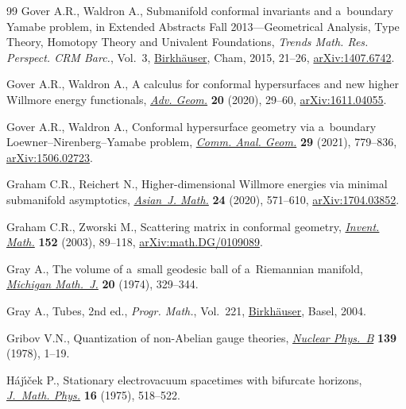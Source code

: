 \documentclass[10pt,a4paper]{article}
\numberwithin{equation}{section}
\renewcommand{\=}{\stackrel \Lambda =}
\begin{document}
\begin{thebibliography}{99}
Gover A.R., Waldron A., Submanifold conformal invariants and a~boundary
 {Y}amabe problem, in Extended Abstracts {F}all 2013---Geometrical Analysis,
 Type Theory, Homotopy Theory and Univalent Foundations, \textit{Trends Math.
 Res. Perspect. CRM Barc.}, Vol.~3, \href{https://doi.org/10.1007/978-3-319-21284-5_4}{Birkh\"auser}, Cham, 2015, 21--26,
 \href{https://arxiv.org/abs/1407.6742}{arXiv:1407.6742}.

Gover A.R., Waldron A., A calculus for conformal hypersurfaces and new higher
 {W}illmore energy functionals, \href{https://doi.org/10.1515/advgeom-2019-0016}{\textit{Adv. Geom.}} \textbf{20} (2020),
 29--60, \href{https://arxiv.org/abs/1611.04055}{arXiv:1611.04055}.

Gover A.R., Waldron A., Conformal hypersurface geometry via a~boundary
 {L}oewner--{N}irenberg--{Y}amabe problem, \href{https://doi.org/10.4310/CAG.2021.v29.n4.a2}{\textit{Comm. Anal. Geom.}}
 \textbf{29} (2021), 779--836, \href{https://arxiv.org/abs/1506.02723}{arXiv:1506.02723}.

Graham C.R., Reichert N., Higher-dimensional {W}illmore energies via minimal
 submanifold asymptotics, \href{https://doi.org/10.4310/AJM.2020.v24.n4.a3}{\textit{Asian~J. Math.}} \textbf{24} (2020),
 571--610, \href{https://arxiv.org/abs/1704.03852}{arXiv:1704.03852}.

Graham C.R., Zworski M., Scattering matrix in conformal geometry,
 \href{https://doi.org/10.1007/s00222-002-0268-1}{\textit{Invent. Math.}} \textbf{152} (2003), 89--118,
 \href{https://arxiv.org/abs/math.DG/0109089}{arXiv:math.DG/0109089}.

Gray A., The volume of a~small geodesic ball of a~{R}iemannian manifold,
 \href{https://doi.org/10.1307/mmj/1029001150}{\textit{Michigan Math.~J.}} \textbf{20} (1974), 329--344.

Gray A., Tubes, 2nd ed., \textit{Progr. Math.}, Vol.~221, \href{https://doi.org/10.1007/978-3-0348-7966-8}{Birkh\"auser}, Basel,
 2004.

Gribov V.N., Quantization of non-{A}belian gauge theories, \href{https://doi.org/10.1016/0550-3213(78)90175-X}{\textit{Nuclear
 Phys.~B}} \textbf{139} (1978), 1--19.

H\'aj{\'\i}{\v{c}}ek P., Stationary electrovacuum spacetimes with bifurcate
 horizons, \href{https://doi.org/10.1063/1.522575}{\textit{J.~Math. Phys.}} \textbf{16} (1975), 518--522.


\end{thebibliography}
\end{document}
